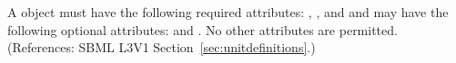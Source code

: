 A \Unit object must have the following required attributes: 
, ,  and 
and may have the following optional attributes:
 and .  No other attributes are permitted.  
(References: SBML L3V1 Section~\ref{sec:unitdefinitions}.)
